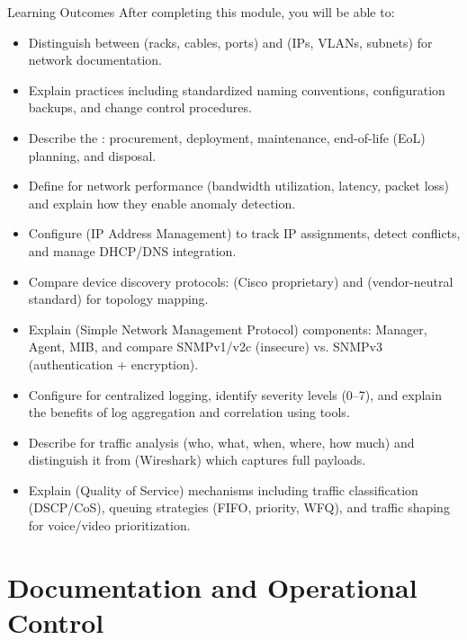 \documentclass[aspectratio=169]{beamer}  %
\begin{document}
\begin{frame}[t,allowframebreaks]{Learning Outcomes}
    After completing this module, you will be able to:
    \vspace{0.5em}
    \small
    \begin{itemize}
        \item Distinguish between  (racks, cables, ports) and  (IPs, VLANs, subnets) for network documentation.
        \item Explain  practices including standardized naming conventions, configuration backups, and change control procedures.
        \item Describe the : procurement, deployment, maintenance, end-of-life (EoL) planning, and disposal.
        \item Define  for network performance (bandwidth utilization, latency, packet loss) and explain how they enable anomaly detection.
        \item Configure  (IP Address Management) to track IP assignments, detect conflicts, and manage DHCP/DNS integration.
        \item Compare device discovery protocols:  (Cisco proprietary) and  (vendor-neutral standard) for topology mapping.
        \item Explain  (Simple Network Management Protocol) components: Manager, Agent, MIB, and compare SNMPv1/v2c (insecure) vs. SNMPv3 (authentication + encryption).
        \item Configure  for centralized logging, identify severity levels (0--7), and explain the benefits of log aggregation and correlation using  tools.
        \item Describe  for traffic analysis (who, what, when, where, how much) and distinguish it from  (Wireshark) which captures full payloads.
        \item Explain  (Quality of Service) mechanisms including traffic classification (DSCP/CoS), queuing strategies (FIFO, priority, WFQ), and traffic shaping for voice/video prioritization.
    \end{itemize}
\end{frame}

\section{Documentation and Operational Control}
\end{document}
